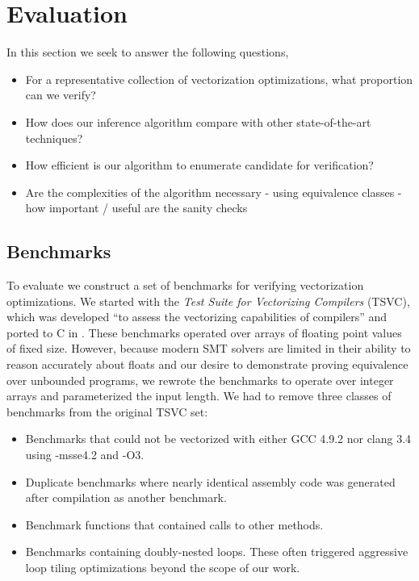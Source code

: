 \section{Evaluation}

In this section we seek to answer the following questions,

\begin{itemize}
\item For a representative collection of vectorization optimizations, what proportion can we verify?
\item How does our \bisim{} inference algorithm compare with other state-of-the-art techniques?
\item How efficient is our algorithm to enumerate candidate \bisimreps{} for verification?
\item Are the complexities of the algorithm necessary
        - using equivalence classes
        - how important / useful are the sanity checks
\end{itemize}

\subsection{Benchmarks}

To evaluate \tool{} we construct a set of benchmarks for verifying
vectorization optimizations. We started with the \emph{Test Suite
for Vectorizing Compilers} (TSVC), which was developed ``to assess
the vectorizing capabilities of compilers'' and ported to C in
\cite{TSVC}. These benchmarks operated over arrays of floating point
values of fixed size. However, because modern SMT solvers are limited
in their ability to reason accurately about floats and our desire to
demonstrate proving equivalence over unbounded programs, we rewrote
the benchmarks to operate over integer arrays and parameterized the
input length.  We had to remove three classes of benchmarks from the
original TSVC set:

\begin{itemize}
\item Benchmarks that could not be vectorized with either GCC 4.9.2 nor clang 3.4 using -msse4.2 and -O3.
\item Duplicate benchmarks where nearly identical assembly code was generated after compilation as another benchmark. 
\item Benchmark functions that contained calls to other methods. 
\item Benchmarks containing doubly-nested loops.  These often triggered aggressive loop tiling optimizations beyond the scope of our work. 
\end{itemize}

